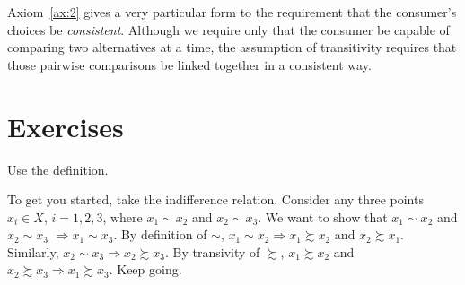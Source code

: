 \documentclass[b5paper]{memoir}
\begin{document}
Axiom~\ref{ax:2} gives a very particular form to the requirement that the consumer’s
choices be \emph{consistent}. Although we require only that the consumer be capable of
comparing two alternatives at a time, the assumption of transitivity requires that those
pairwise comparisons be linked together in a consistent way.

\section{Exercises}


%
{Use the definition.}



% 
{To get you started, take the indifference relation. Consider any three points $x_i \in
X$, $i=1, 2, 3$, where $x_1 \sim x_2$ and $x_2 \sim x_3$. We want to show that $x_1 \sim
x_2$ and $x_2 \sim x_3$ $\Rightarrow x_1 \sim x_3$. By definition of $\sim$, $x_1 \sim x_2
\Rightarrow x_1 \succsim x_2$ and $x_2 \succsim x_1$. Similarly, $x_2 \sim x_3 \Rightarrow
x_2 \succsim x_3$. By transivity of $\succsim$, $x_1 \succsim x_2$ and $x_2 \succsim x_3
\Rightarrow x_1 \succsim x_3$. Keep going.}
\end{document}
